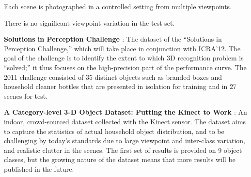 Each scene is photographed in a controlled setting from multiple viewpoints.

There is no significant viewpoint variation in the test set.

{\bf Solutions in Perception Challenge \cite{SIPC2011}}:
The dataset of the ``Solutions in Perception Challenge,'' which will take place in conjunction with ICRA'12.
The goal of the challenge is to identify the extent to which 3D recognition problem is ``solved;'' it thus focuses on the high-precision part of the performance curve.
The 2011 challenge consisted of 35 distinct objects such as branded boxes and household cleaner bottles that are presented in isolation for training and in 27 scenes for test.

{\bf A Category-level 3-D Object Dataset: Putting the Kinect to Work \cite{Janoch2011}}:
An indoor, crowd-sourced dataset collected with the Kinect sensor.
The dataset aims to capture the statistics of actual household object distribution, and to be challenging by today's standards due to large viewpoint and inter-class variation, and realistic clutter in the scenes.
The first set of results is provided on 9 object classes, but the growing nature of the dataset means that more results will be published in the future.

